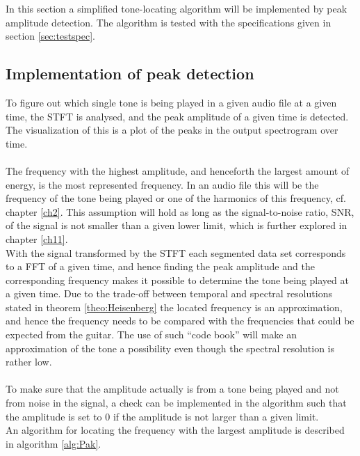 \label{sec:peak_detection}
In this section a simplified tone-locating algorithm will be implemented by peak amplitude detection.
The algorithm is tested with the specifications given in section \ref{sec:testspec}.
\subsection{Implementation of peak detection}
To figure out which single tone is being played in a given audio file at a given time, the STFT is analysed, and the peak amplitude of a given time is detected.
The visualization of this is a plot of the peaks in the output spectrogram over time.
\\ \\
The frequency with the highest amplitude, and henceforth the largest amount of energy, is the most represented frequency. 
In an audio file this will be the frequency of the tone being played or one of the harmonics of this frequency, cf. chapter \ref{ch2}.
This assumption will hold as long as the signal-to-noise ratio, SNR, of the signal is not smaller than a given lower limit, which is further explored in chapter \ref{ch11}. \\
With the signal transformed by the STFT each segmented data set corresponds to a FFT of a given time, and hence finding the peak amplitude and the corresponding frequency makes it possible to determine the tone being played at a given time. Due to the trade-off between temporal and spectral resolutions stated in theorem \ref{theo:Heisenberg} the located frequency is an approximation, and hence the frequency needs to be compared with the frequencies that could be expected from the guitar.
The use of such ``code book'' will make an approximation of the tone a possibility even though the spectral resolution is rather low.
\\ \\
To make sure that the amplitude actually is from a tone being played and not from noise in the signal, a check can be implemented in the algorithm such that the amplitude is set to $0$ if the amplitude is not larger than a given limit. \\
An algorithm for locating the frequency with the largest amplitude is described in algorithm \ref{alg:Pak}.

